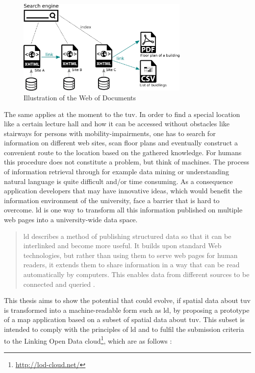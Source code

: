 \documentclass[draft,final]{vutinfth} %
\begin{document}
\begin{figure}[h]
    \centering    
    \includegraphics[width=0.75\textwidth]{graphics/webOfDocuments.png}
    \caption{Illustration of the Web of Documents}
    \label{fig:motiviation-web-of-documents}
\end{figure}

The same applies at the moment to the \gls{tuv}. In order to find a special location like a certain lecture hall and how it can be accessed without obstacles like stairways for persons with mobility-impairments, one has to search for information on different web sites, scan floor plans and eventually construct a convenient route to the location based on the gathered knowledge. For humans this procedure does not constitute a problem, but think of machines. The process of information retrieval through for example data mining or understanding natural language is quite difficult and/or time consuming. As a consequence application developers that may have innovative ideas, which would benefit the information environment of the university, face a barrier that is hard to overcome. \gls{ld} is one way to transform all this information published on multiple web pages into a university-wide data space.

\begin{quote} \gls{ld} describes a method of publishing structured data so that it can be interlinked and become more useful. It builds upon standard Web technologies, but rather than using them to serve web pages for human readers, it extends them to share information in a way that can be read automatically by computers. This enables data from different sources to be connected and queried
\cite{bizer_linked_2009}.\end{quote}

This thesis aims to show the potential that could evolve, if spatial data about \gls{tuv} is transformed into a machine-readable form such as \gls{ld}, by proposing a prototype of a map application based on a subset of spatial data about \gls{tuv}. This subset is intended to comply with the principles of \gls{ld} \cite{berners-lee_linked_2009} and to fulfil the submission criteria to the Linking Open Data cloud\footnote{\url{http://lod-cloud.net/}}, which are as follows \cite{cyganiak_linking_2011}:
\end{document}
